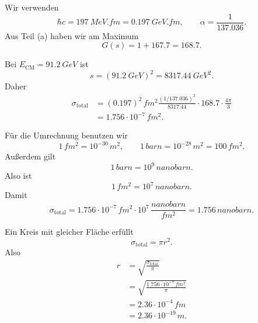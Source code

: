 \documentclass[11pt,a4paper]{scrartcl}
\begin{document}
\begin{enumerate}[label=(\alph*)]
            \begin{calculationbox}
                Wir verwenden
                \[
                    \hbar c=\SI{197}{MeV.fm}=\SI{0.197}{GeV.fm},
                    \qquad
                    \alpha=\frac{1}{137.036}.
                \]
                Aus Teil (a) haben wir am Maximum
                \[
                    G(s)=1+167.7=168.7.
                \]

                \begin{calculationbox}
                    Bei $E_{\mathrm{CM}}=\SI{91.2}{GeV}$ ist
                    \[
                        s=(\SI{91.2}{GeV})^2=\SI{8317.44}{GeV^2}.
                    \]
                    Daher
                    \begin{align*}
                        \sigma_{\mathrm{total}}
                        &=(0.197)^2\,\si{fm^2}\frac{(1/137.036)^2}{8317.44}
                        \cdot168.7\cdot\frac{4\pi}{3}\\
                        &=1.756\cdot10^{-7}\,\si{fm^2}.
                    \end{align*}
                \end{calculationbox}

                \begin{calculationbox}
                    Für die Umrechnung benutzen wir
                    \[
                        1\,\si{fm^2}=10^{-30}\,\si{m^2},
                        \qquad
                        1\,\si{barn}=10^{-28}\,\si{m^2}=100\,\si{fm^2}.
                    \]
                    Außerdem gilt
                    \[
                        1\,\si{barn}=10^9\,\si{nanobarn}.
                    \]
                    Also ist
                    \[
                        1\,\si{fm^2}=10^7\,\si{nanobarn}.
                    \]
                    Damit
                    \[
                        \sigma_{\mathrm{total}}
                        =1.756\cdot10^{-7}\,\si{fm^2}\cdot10^7\,\frac{\si{nanobarn}}{\si{fm^2}}
                        =1.756\,\si{nanobarn}.
                    \]
                \end{calculationbox}

                \begin{calculationbox}
                    Ein Kreis mit gleicher Fläche erfüllt
                    \[
                        \sigma_{\mathrm{total}}=\pi r^2.
                    \]
                    Also
                    \begin{align*}
                        r&=\sqrt{\frac{\sigma_{\mathrm{total}}}{\pi}}\\
                        &=\sqrt{\frac{1.756\cdot10^{-7}\,\si{fm^2}}{\pi}}\\
                        &=2.36\cdot10^{-4}\,\si{fm}\\
                        &=2.36\cdot10^{-19}\,\si{m}.
                    \end{align*}
                \end{calculationbox}
            \end{calculationbox}


\end{enumerate}
\end{document}
